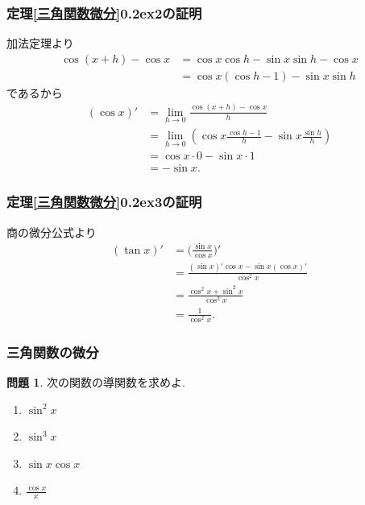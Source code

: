 \documentclass[dvipdfmx,cjk,10.2pt]{beamer}
\newcommand{\ctext}[1]{\raise0.2ex\hbox{\textcircled{\scriptsize{#1}}}}
\theoremstyle{definition}
\newtheorem{Prob}[Thm]{問題}
\begin{document}


\begin{frame}
\frametitle{定理\ref{三角関数微分}\ctext{2}の証明}

加法定理より
\begin{align*} 
\cos(x +h)-\cos x & = \cos x \cos h - \sin x \sin h -\cos x \\
& =  \cos x (\cos h-1) - \sin x \sin h
\end{align*}
であるから
\begin{align*}
(\cos x)' &= \lim_{h \to 0} \frac{\cos(x +h)-\cos x}{h} \\
& =  \lim_{h \to 0} (\cos x \frac{\cos h-1}{h} - \sin x \frac{\sin h}{h}) \\
& =\cos x \cdot 0 - \sin x \cdot 1 \\
& = -\sin x. 
\end{align*}
\end{frame}




\begin{frame}
\frametitle{定理\ref{三角関数微分}\ctext{3}の証明}

商の微分公式より
\begin{align*} 
(\tan x)' &= \Big( \frac{\sin x}{\cos x} \Big)' \\
&= \frac{(\sin x)'\cos x - \sin x (\cos x)'}{\cos^2 x} \\
&= \frac{\cos^2 x + \sin^2 x}{\cos^2 x} \\
&= \frac{1}{\cos^2 x}. 
\end{align*}

\end{frame}




\begin{frame}
\frametitle{三角関数の微分}

\begin{Prob}
次の関数の導関数を求めよ. 
\begin{enumerate}
\item $\sin^2 x$
\item $\sin^3 x$
\item $\sin x \cos x$
\item $\frac{\cos x}{x}$
\end{enumerate}
\end{Prob}

\end{frame}
\end{document}
